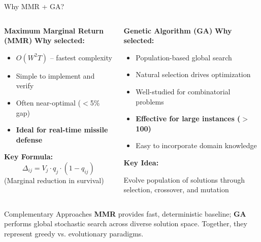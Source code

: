 \documentclass[aspectratio=43,8pt]{beamer}
\begin{document}
\begin{frame}{Why MMR + GA?}
\begin{columns}[t]
\begin{block}{\textbf{Maximum Marginal Return (MMR)}}
\textbf{Why selected:}
\begin{itemize}
    \item \textcolor{accentgreen}{$O(W^2T)$} -- fastest complexity
    \item Simple to implement and verify
    \item Often near-optimal ($<$5\% gap)
    \item \textbf{Ideal for real-time missile defense}
\end{itemize}

\vspace{0.2cm}
\textbf{Key Formula:}
$$\Delta_{ij} = V_j \cdot q_j \cdot (1 - q_{ij})$$
{\small (Marginal reduction in survival)}
\end{block}

\begin{alertblock}{\textbf{Genetic Algorithm (GA)}}
\textbf{Why selected:}
\begin{itemize}
    \item Population-based global search
    \item Natural selection drives optimization
    \item Well-studied for combinatorial problems
    \item \textbf{Effective for large instances ($>$100)}
    \item Easy to incorporate domain knowledge
\end{itemize}

\vspace{0.2cm}
\textbf{Key Idea:}

{\small Evolve population of solutions through selection, crossover, and mutation}
\end{alertblock}
\end{columns}

\vspace{0.3cm}
\begin{exampleblock}{Complementary Approaches}
\textbf{MMR} provides fast, deterministic baseline; \textbf{GA} performs global stochastic search across diverse solution space. Together, they represent greedy vs. evolutionary paradigms.
\end{exampleblock}
\end{frame}
\end{document}
